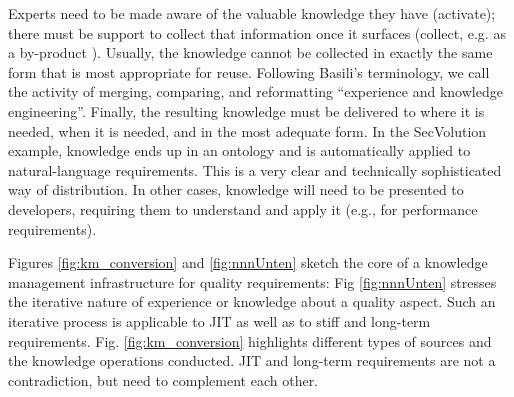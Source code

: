 Experts need to be made aware of the valuable knowledge they have (activate); there must be support to collect that information once it surfaces (collect, e.g. as a by-product \cite{Schneider2006}). Usually, the knowledge cannot be collected in exactly the same form that is most appropriate for reuse. Following Basili’s \cite{Basili1994} terminology, we call the activity of merging, comparing, and reformatting ``experience and knowledge engineering''. Finally, the resulting knowledge must be delivered to where it is needed, when it is needed, and in the most adequate form. In the SecVolution example, knowledge ends up in an ontology and is automatically applied to natural-language requirements. This is a very clear and technically sophisticated way of distribution. In other cases, knowledge will need to be presented to developers, requiring them to understand and apply it (e.g., for performance requirements).

Figures \ref{fig:km_conversion} and \ref{fig:nnnUnten} sketch the core of a knowledge management infrastructure for quality requirements: Fig \ref{fig:nnnUnten}  stresses the iterative nature of experience or knowledge about a quality aspect. Such an iterative process is applicable to JIT as well as to stiff and long-term requirements. Fig. \ref{fig:km_conversion} highlights different types of sources and the knowledge operations conducted. %
JIT and long-term requirements are not a contradiction, but need to complement each other.


